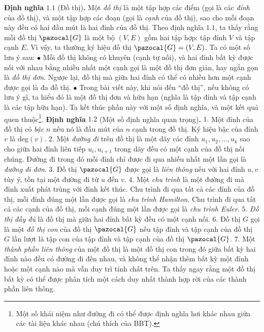 \begin{multicols}{2}
	\vskip 0.1cm
	\textbf{\color{hoccungpi}Định nghĩa} $\pmb{1.1}$ (Đồ thị)\textbf{\color{hoccungpi}.}
		Một \textit{đồ thị} là một tập hợp các điểm (gọi là các \textit{đỉnh} của đồ thị), và một tập hợp các đoạn (gọi là \textit{cạnh} của đồ thị), sao cho mỗi đoạn này đều có hai đầu mút là hai đỉnh của đồ thị. 
	\vskip 0.1cm
	Theo định nghĩa $1.1$, ta thấy rằng mỗi đồ thị $\pazocal{G}$ là một bộ $(V,E)$ gồm hai tập hợp: tập đỉnh $V$ và tập cạnh $E$. Vì vậy, ta thường ký hiệu đồ thị $\pazocal{G} = (V,E)$. Ta có một số lưu ý sau:  
	\vskip 0.1cm
	$\bullet$ Mỗi đồ thị không có khuyên (cạnh tự nối), và hai đỉnh bất kỳ được nối với nhau bằng nhiều nhất một cạnh gọi là một đồ thị đơn giản, hay ngắn gọn là \textit{đồ thị đơn}. Ngược lại, đồ thị mà giữa hai đỉnh có thể có nhiều hơn một cạnh được gọi là đa đồ thị.
	\vskip 0.1cm
	$\bullet$ Trong bài viết này, khi nói đến ``đồ thị'', nếu không có lưu ý gì, ta hiểu đó là một đồ thị đơn và hữu hạn (nghĩa là tập đỉnh và tập cạnh là các tập hữu hạn).
	\vskip 0.1cm
	Ta kết thúc phần này với một số định nghĩa, và một kết quả quen thuộc\footnote[3]{\color{hoccungpi}Một số khái niệm như đường đi có thể được định nghĩa hơi khác nhau giữa các tài liệu khác nhau (chú thích của BBT).}. 
	\vskip 0.1cm
	\textbf{\color{hoccungpi}Định nghĩa} $\pmb{1.2}$ (Một số định nghĩa quan trọng)\textbf{\color{hoccungpi}.}
	\vskip 0.1cm
	$1.$ Một đỉnh của đồ thị có \textit{bậc} $n$ nếu nó là đầu mút của $n$ cạnh trong đồ thị. Ký hiệu bậc của  đỉnh $v$ là deg$(v)$. 
	\vskip 0.1cm
	$2.$ Một \textit{đường đi} trên đồ thị là một dãy các đỉnh $u_1, u_2, \dots,u_k$ sao cho giữa hai đỉnh liên tiếp $u_i,u_{i+1}$ trong dãy đều có một cạnh của đồ thị nối chúng. Đường đi trong đó mỗi đỉnh chỉ được đi qua nhiều nhất một lần gọi là \textit{đường đi đơn}.
	\vskip 0.1cm
	$3.$ Đồ thị $\pazocal{G}$ được gọi là \textit{liên thông} nếu với hai đỉnh $u,v$ tùy ý, tồn tại một đường đi từ $u$ đến $v$.
	\vskip 0.1cm
	$4.$ Một \textit{chu trình} là một đường đi mà đỉnh xuất phát trùng với đỉnh kết thúc. Chu trình đi qua tất cả các đỉnh của đồ thị, mỗi đỉnh đúng một lần  được gọi là \textit{chu trình Hamilton}. Chu trình đi qua tất cả các cạnh của đồ thị, mỗi cạnh đúng một lần được gọi là \textit{chu trình Euler}.
	\vskip 0.1cm
	$5.$ \textit{Đồ thị đầy đủ} là đồ thị mà giữa hai đỉnh bất kỳ đều có một cạnh nối. 
	\vskip 0.1cm
	$6.$ Đồ thị $G$ gọi là một \textit{đồ thị con} của đồ thị $\pazocal{G}$ nếu tập đỉnh và tập cạnh của đồ thị $G$ lần lượt là tập con của tập đỉnh và tập cạnh của đồ thị $\pazocal{G}$.
	\vskip 0.1cm
	$7.$ Một \textit{thành phần liên thông} của một đồ thị là một đồ thị con trong đó giữa bất kỳ hai đỉnh nào đều có đường đi đến nhau, và không thể nhận thêm bất kỳ một đỉnh hoặc một cạnh nào mà vẫn duy trì tính chất trên. Ta thấy ngay rằng một đồ thị bất kỳ có thể được phân tích một cách duy nhất thành hợp rời của các  thành phần liên thông. 

\end{multicols}
